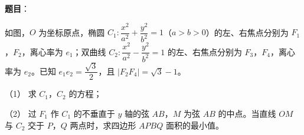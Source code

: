 \begin{answer}


\end{answer}
\begin{answer}

\textbf{题目}：

如图，$O$ 为坐标原点，椭圆 $C_1:\dfrac{x^2}{a^2}+\dfrac{y^2}{b^2}=1$（$a>b>0$）的左、右焦点分别为 $F_1$，$F_2$，离心率为 $e_1$；双曲线 $C_2:\dfrac{x^2}{a^2}-\dfrac{y^2}{b^2}=1$ 的左、右焦点分别为 $F_3$，$F_4$，离心率为 $e_2$。已知 $e_1e_2=\dfrac{\sqrt3}2$，且 $|F_2F_4|=\sqrt3-1$。
\nopagebreak[4]
\begin{center}\end{center}
\nopagebreak[4]
（1） 求 $C_1$，$C_2$ 的方程；

（2） 过 $F_1$ 作 $C_1$ 的不垂直于 $y$ 轴的弦 $AB$，$M$ 为弦 $AB$ 的中点。当直线 $OM$ 与 $C_2$ 交于 $P$，$Q$ 两点时，求四边形 $APBQ$ 面积的最小值。


\end{answer}
